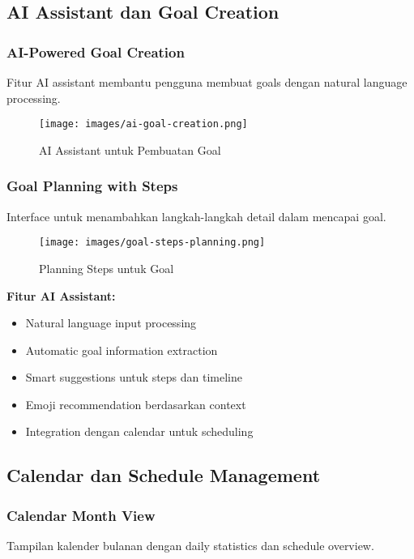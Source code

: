 \subsection{AI Assistant dan Goal Creation}

\subsubsection{AI-Powered Goal Creation}
Fitur AI assistant membantu pengguna membuat goals dengan natural language processing.

\begin{figure}[H]
\centering
\texttt{[image: images/ai-goal-creation.png]}
\caption{AI Assistant untuk Pembuatan Goal}
\label{fig:ai-goal-creation}
\end{figure}

\subsubsection{Goal Planning with Steps}
Interface untuk menambahkan langkah-langkah detail dalam mencapai goal.

\begin{figure}[H]
\centering
\texttt{[image: images/goal-steps-planning.png]}
\caption{Planning Steps untuk Goal}
\label{fig:goal-steps}
\end{figure}

\textbf{Fitur AI Assistant:}
\begin{itemize}
\item Natural language input processing
\item Automatic goal information extraction
\item Smart suggestions untuk steps dan timeline
\item Emoji recommendation berdasarkan context
\item Integration dengan calendar untuk scheduling
\end{itemize}

\subsection{Calendar dan Schedule Management}

\subsubsection{Calendar Month View}
Tampilan kalender bulanan dengan daily statistics dan schedule overview.

